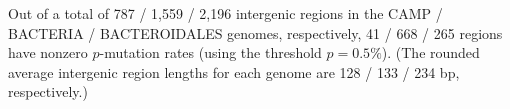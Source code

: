 Out of a total of 787 / 1,559 / 2,196 intergenic regions in the CAMP / BACTERIA / BACTEROIDALES genomes, respectively, 41 / 668 / 265 regions have nonzero $p$-mutation rates (using the threshold $p=0.5\%$). (The rounded average intergenic region lengths for each genome are 128 / 133 / 234 bp, respectively.)\endinput